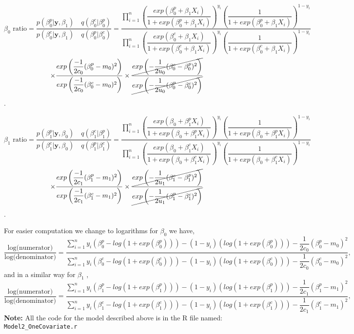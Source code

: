 \documentclass[10pt,a4paper]{article}
\begin{document}
\[ \beta_0 \text{ ratio} =\dfrac{p(\beta_0^p|\textbf{y}, \beta_1)\quad q(\beta_0^c|\beta_0^p)}{p(\beta_0^c|\textbf{y}, \beta_1) \quad q(\beta_0^p|\beta_0^c)}=\dfrac{\prod_{i=1}^n\left(\dfrac{exp(\beta_0^p + \beta_1 X_i)}{1+exp(\beta_0^p + \beta_1 X_i)}\right)^{y_i}\left( \dfrac{1}{1+exp(\beta_0^p + \beta_1 X_i)}\right)^{1-y_i}}{\prod_{i=1}^n\left(\dfrac{exp(\beta_0^c+ \beta_1 X_i)}{1+exp(\beta_0^c+ \beta_1 X_i)}\right)^{y_i}\left( \dfrac{1}{1+exp(\beta_0^c+ \beta_1 X_i)}\right)^{1-y_i}}\]
\[\times \dfrac{exp\left(\dfrac{-1}{2c_0}(\beta_0^p-m_0)^2\right)}{exp\left(\dfrac{-1}{2c_0}(\beta_0^c-m_0)^2\right)}\times \dfrac{\cancel{exp\left(-\dfrac{1}{2u_0}(\beta_{0}^c-\beta_{0}^p)^2\right)}}{\cancel{exp\left(-\dfrac{1}{2u_0}(\beta_{0}^p-\beta_{0}^c)^2\right)}}\].

\[\beta_1 \text{ ratio} =\dfrac{p(\beta_1^p|\textbf{y}, \beta_0)\quad q(\beta_1^c|\beta_1^p)}{p(\beta_1^c|\textbf{y},\beta_0) \quad q(\beta_1^p|\beta_1^c)}=\dfrac{\prod_{i=1}^n\left(\dfrac{exp(\beta_0 + \beta_1^p X_i)}{1+exp(\beta_0 + \beta_1^p X_i)}\right)^{y_i}\left( \dfrac{1}{1+exp(\beta_0 + \beta_1^p X_i)}\right)^{1-y_i}}{\prod_{i=1}^n\left(\dfrac{exp(\beta_0+ \beta_1^c X_i)}{1+exp(\beta_0+ \beta^c_1 X_i)}\right)^{y_i}\left( \dfrac{1}{1+exp(\beta_0+ \beta_1^c X_i)}\right)^{1-y_i}}\]
\[\times \dfrac{exp\left(\dfrac{-1}{2c_1}(\beta_1^p-m_1)^2\right)}{exp\left(\dfrac{-1}{2c_1}(\beta_1^c-m_1)^2\right)}\times \dfrac{\cancel{exp\left(-\dfrac{1}{2u_1}(\beta_{1}^c-\beta_{1}^p)^2\right)}}{\cancel{exp\left(-\dfrac{1}{2u_1}(\beta_{1}^p-\beta_{1}^c)^2\right)}}\].

For easier computation we change to logarithms for $\beta_0$ we have,
\[ \dfrac{\text{log(numerator)}}{\text{log(denominator)}}=
 \dfrac{\sum_{i=1}^n y_i(\beta_0^p-log(1+exp(\beta_0^p)))- (1-y_i)(log(1+exp(\beta_0^p)))-\dfrac{1}{2c_0}(\beta_0^p-m_0)^2}{\sum_{i=1}^n y_i(\beta_0^c-log(1+exp(\beta_0^c)))- (1-y_i)(log(1+exp(\beta_0^c)))-\dfrac{1}{2c_0}(\beta_0^c-m_0)^2},
\]
 and in a similar way for $\beta_1$ ,
 \[ \dfrac{\text{log(numerator)}}{\text{log(denominator)}}=
 \dfrac{\sum_{i=1}^n y_i(\beta_1^p-log(1+exp(\beta_1^p)))- (1-y_i)(log(1+exp(\beta_1^p)))-\dfrac{1}{2c_1}(\beta_1^p-m_1)^2}{\sum_{i=1}^n y_i(\beta_1^c-log(1+exp(\beta_1^c)))- (1-y_i)(log(1+exp(\beta_1^c)))-\dfrac{1}{2c_1}(\beta_1^c-m_1)^2},
\]
 \textbf{Note:} All the code for the model described above is in the R file named: \texttt{Model2\_OneCovariate.r}
\end{document}
